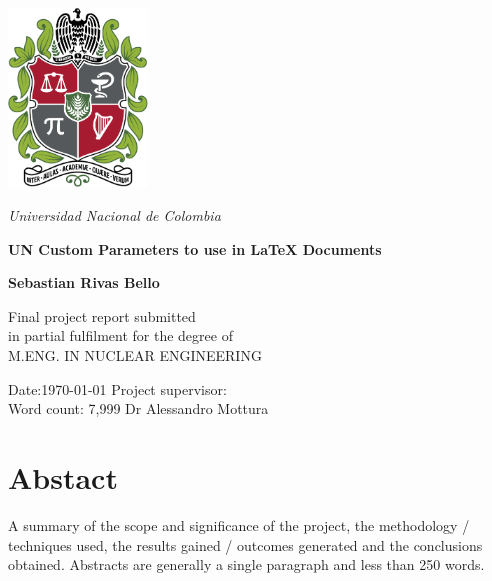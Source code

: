 \documentclass[12pt, letterpaper]{memoir}
\begin{document}



\onehalfspacing

\begin{center}
\includegraphics[width=10em]{Pics/UN_Shield.pdf}

\vspace{0.2in}
{\Large \textit{\color{UNBlueS}Universidad Nacional de Colombia}}

\vspace{0.8in}

{\Huge \textbf{\color{UNRed2}UN Custom Parameters to use in \LaTeX{} Documents } }

\vspace{0.5in}

{\Large \textbf{\color{UNBlack}Sebastian Rivas Bello}}

\vspace{1.2in}
Final project report submitted\\ 
in partial fulfilment for the degree of\\
M.ENG. IN NUCLEAR ENGINEERING
\end{center}

\vfill{}

Date:\today{}     \hfill{} Project supervisor: \\
Word count: 7,999   \hfill{} Dr Alessandro Mottura
\thispagestyle{empty}


\chapter*{Abstact}

A summary of the scope and significance of the project, the methodology / techniques used, the results gained / outcomes generated and the conclusions obtained. Abstracts are generally a single paragraph and less than 250 words.
\end{document}
